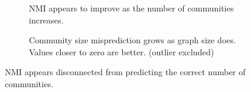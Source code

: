 \begin{figure}[htbp]
    \centering
    \begin{subfigure}[b]{0.45\textwidth}  %
        \centering
        \caption{\acs{NMI} appears to improve as the number of communities increases.}
        \label{fig:gt-community-nmi}
    \end{subfigure}
    \hfill
    \begin{subfigure}[b]{0.45\textwidth}  %
        \centering
        \caption{Community size misprediction grows as graph size does. Values closer to zero are better. (outlier excluded)}
        \label{fig:gt-community-sizes}
    \end{subfigure}
    \caption{NMI appears disconnected from predicting the correct number of communities.}
    \label{fig:cd-results-effectiveness-communities}
\end{figure}